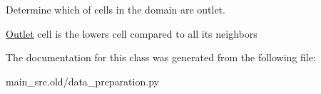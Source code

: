Determine which of cells in the domain are outlet. 

\hyperlink{classmain__src_8old_1_1data__preparation_1_1Outlet}{Outlet} cell is the lowers cell compared to all its neighbors 

The documentation for this class was generated from the following file\-:\begin{DoxyCompactItemize}
\item 
main\-\_\-src.\-old/data\-\_\-preparation.\-py\end{DoxyCompactItemize}
